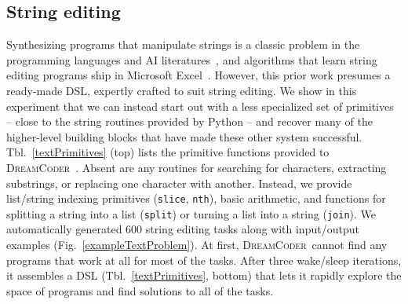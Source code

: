\documentclass{article}
\newcommand{\system}{\textsc{DreamCoder}~}
\newcommand{\code}[1]{{\footnotesize\texttt{#1}}}
\begin{document}


\subsection{String editing}\label{textSection}
Synthesizing programs that manipulate strings is a classic problem in the
programming languages and AI literatures~\cite{menon2013machine,lau2001programming},
and algorithms that learn string editing programs ship in Microsoft Excel~\cite{gulwani2011automating}.
However, this prior work presumes a ready-made DSL,
expertly crafted to suit string editing.
We show in this experiment that we can instead start out with a
less specialized set of primitives -- close to the string routines provided by Python --
and recover many of the higher-level building blocks that have made these
other system successful.
Tbl.~\ref{textPrimitives} (top) lists the primitive functions provided to \system.
Absent are any routines for searching for characters, extracting substrings,
or replacing one character with another.
Instead, we provide list/string indexing primitives (\code{slice}, \code{nth}),
basic arithmetic, and functions for splitting a string into a list (\code{split})
or turning a list into a string (\code{join}).
We automatically generated  600 string editing tasks along with input/output examples (Fig.~\ref{exampleTextProblem}). %
At first, \system cannot find any programs that
work at all for most of the tasks.
After three wake/sleep iterations,
it assembles a DSL (Tbl.~\ref{textPrimitives}, bottom) that lets it rapidly explore the space of programs and find solutions to
all of the tasks.
\end{document}
